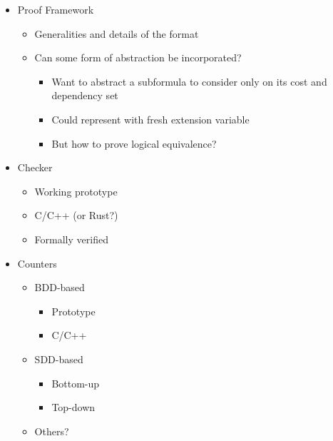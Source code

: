 \documentclass{llncs}
\begin{document}
\begin{itemize}
\item Proof Framework
  \begin{itemize}
  \item Generalities and details of the format
  \item Can some form of abstraction be incorporated?
    \begin{itemize}
    \item Want to abstract a subformula to consider only on its cost and dependency set
    \item Could represent with fresh extension variable
    \item But how to prove logical equivalence?
    \end{itemize}
  \end{itemize}

\item Checker
  \begin{itemize}
  \item Working prototype
  \item C/C++ (or Rust?)
  \item Formally verified
  \end{itemize}

\item Counters
\begin{itemize}
\item BDD-based
  \begin{itemize}
  \item Prototype
  \item C/C++
  \end{itemize}

  \item SDD-based
  \begin{itemize}
  \item Bottom-up
  \item Top-down
  \end{itemize}

\item Others?
\end{itemize}
\end{itemize}



\end{document}
